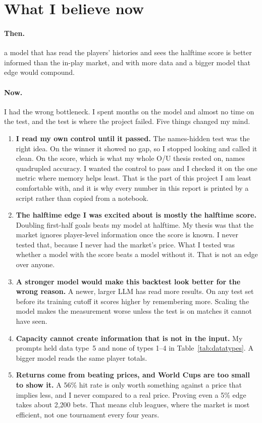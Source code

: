 \documentclass[10pt,letterpaper]{article}
\begin{document}
\section{What I believe now}

\paragraph{Then.} a model that has read the players' histories and sees the halftime score is
better informed than the in-play market, and with more data and a bigger model that edge
would compound.

\paragraph{Now.} I had the wrong bottleneck. I spent months on the model and almost no time on
the test, and the test is where the project failed. Five things changed my mind.

\begin{enumerate}
\item \textbf{I read my own control until it passed.} The names-hidden test was the right
  idea. On the winner it showed no gap, so I stopped looking and called it clean. On the
  score, which is what my whole O/U thesis rested on, names quadrupled accuracy. I wanted
  the control to pass and I checked it on the one metric where memory helps least. That is
  the part of this project I am least comfortable with, and it is why every number in this
  report is printed by a script rather than copied from a notebook.
\item \textbf{The halftime edge I was excited about is mostly the halftime score.} Doubling
  first-half goals beats my model at halftime. My thesis was that the market ignores
  player-level information once the score is known. I never tested that, because I never
  had the market's price. What I tested was whether a model with the score beats a model
  without it. That is not an edge over anyone.
\item \textbf{A stronger model would make this backtest look better for the wrong reason.}
  A newer, larger LLM has read more results. On any test set before its training cutoff it
  scores higher by remembering more. Scaling the model makes the measurement worse unless
  the test is on matches it cannot have seen.
\item \textbf{Capacity cannot create information that is not in the input.} My prompts
  held data type~5 and none of types 1--4 in Table~\ref{tab:datatypes}. A bigger model
  reads the same player totals.
\item \textbf{Returns come from beating prices, and World Cups are too small to show it.}
  A 56\% hit rate is only worth something against a price that implies less, and I never
  compared to a real price. Proving even a 5\% edge takes about 2{,}200 bets. That means
  club leagues, where the market is most efficient, not one tournament every four years.
\end{enumerate}
\end{document}
